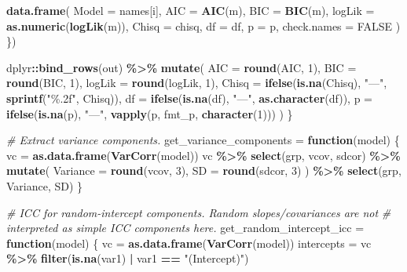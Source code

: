 \documentclass[
]{article}
\newenvironment{Shaded}{\begin{snugshade}}{\end{snugshade}}
\newcommand{\AttributeTok}[1]{\textcolor[rgb]{0.13,0.29,0.53}{#1}}
\newcommand{\CommentTok}[1]{\textcolor[rgb]{0.56,0.35,0.01}{\textit{#1}}}
\newcommand{\ConstantTok}[1]{\textcolor[rgb]{0.56,0.35,0.01}{#1}}
\newcommand{\ControlFlowTok}[1]{\textcolor[rgb]{0.13,0.29,0.53}{\textbf{#1}}}
\newcommand{\DecValTok}[1]{\textcolor[rgb]{0.00,0.00,0.81}{#1}}
\newcommand{\FunctionTok}[1]{\textcolor[rgb]{0.13,0.29,0.53}{\textbf{#1}}}
\newcommand{\NormalTok}[1]{#1}
\newcommand{\OtherTok}[1]{\textcolor[rgb]{0.56,0.35,0.01}{#1}}
\newcommand{\SpecialCharTok}[1]{\textcolor[rgb]{0.81,0.36,0.00}{\textbf{#1}}}
\newcommand{\StringTok}[1]{\textcolor[rgb]{0.31,0.60,0.02}{#1}}
\begin{document}
\begin{Shaded}
\begin{Highlighting}[]
    \FunctionTok{data.frame}\NormalTok{(}
      \AttributeTok{Model =}\NormalTok{ names[i],}
      \AttributeTok{AIC =} \FunctionTok{AIC}\NormalTok{(m),}
      \AttributeTok{BIC =} \FunctionTok{BIC}\NormalTok{(m),}
      \AttributeTok{logLik =} \FunctionTok{as.numeric}\NormalTok{(}\FunctionTok{logLik}\NormalTok{(m)),}
      \AttributeTok{Chisq =}\NormalTok{ chisq,}
      \AttributeTok{df =}\NormalTok{ df,}
      \AttributeTok{p =}\NormalTok{ p,}
      \AttributeTok{check.names =} \ConstantTok{FALSE}
\NormalTok{    )}
\NormalTok{  \})}

\NormalTok{  dplyr}\SpecialCharTok{::}\FunctionTok{bind\_rows}\NormalTok{(out) }\SpecialCharTok{\%\textgreater{}\%}
    \FunctionTok{mutate}\NormalTok{(}
      \AttributeTok{AIC =} \FunctionTok{round}\NormalTok{(AIC, }\DecValTok{1}\NormalTok{),}
      \AttributeTok{BIC =} \FunctionTok{round}\NormalTok{(BIC, }\DecValTok{1}\NormalTok{),}
      \AttributeTok{logLik =} \FunctionTok{round}\NormalTok{(logLik, }\DecValTok{1}\NormalTok{),}
      \AttributeTok{Chisq =} \FunctionTok{ifelse}\NormalTok{(}\FunctionTok{is.na}\NormalTok{(Chisq), }\StringTok{"—"}\NormalTok{, }\FunctionTok{sprintf}\NormalTok{(}\StringTok{"\%.2f"}\NormalTok{, Chisq)),}
      \AttributeTok{df =} \FunctionTok{ifelse}\NormalTok{(}\FunctionTok{is.na}\NormalTok{(df), }\StringTok{"—"}\NormalTok{, }\FunctionTok{as.character}\NormalTok{(df)),}
      \AttributeTok{p =} \FunctionTok{ifelse}\NormalTok{(}\FunctionTok{is.na}\NormalTok{(p), }\StringTok{"—"}\NormalTok{, }\FunctionTok{vapply}\NormalTok{(p, fmt\_p, }\FunctionTok{character}\NormalTok{(}\DecValTok{1}\NormalTok{)))}
\NormalTok{    )}
\NormalTok{\}}

\CommentTok{\# Extract variance components.}
\NormalTok{get\_variance\_components }\OtherTok{=} \ControlFlowTok{function}\NormalTok{(model) \{}
\NormalTok{  vc }\OtherTok{=} \FunctionTok{as.data.frame}\NormalTok{(}\FunctionTok{VarCorr}\NormalTok{(model))}
\NormalTok{  vc }\SpecialCharTok{\%\textgreater{}\%}
    \FunctionTok{select}\NormalTok{(grp, vcov, sdcor) }\SpecialCharTok{\%\textgreater{}\%}
    \FunctionTok{mutate}\NormalTok{(}
      \AttributeTok{Variance =} \FunctionTok{round}\NormalTok{(vcov, }\DecValTok{3}\NormalTok{),}
      \AttributeTok{SD =} \FunctionTok{round}\NormalTok{(sdcor, }\DecValTok{3}\NormalTok{)}
\NormalTok{    ) }\SpecialCharTok{\%\textgreater{}\%}
    \FunctionTok{select}\NormalTok{(grp, Variance, SD)}
\NormalTok{\}}

\CommentTok{\# ICC for random{-}intercept components. Random slopes/covariances are not}
\CommentTok{\# interpreted as simple ICC components here.}
\NormalTok{get\_random\_intercept\_icc }\OtherTok{=} \ControlFlowTok{function}\NormalTok{(model) \{}
\NormalTok{  vc }\OtherTok{=} \FunctionTok{as.data.frame}\NormalTok{(}\FunctionTok{VarCorr}\NormalTok{(model))}
\NormalTok{  intercepts }\OtherTok{=}\NormalTok{ vc }\SpecialCharTok{\%\textgreater{}\%}
    \FunctionTok{filter}\NormalTok{(}\FunctionTok{is.na}\NormalTok{(var1) }\SpecialCharTok{|}\NormalTok{ var1 }\SpecialCharTok{==} \StringTok{"(Intercept)"}\NormalTok{)}


\end{Highlighting}
\end{Shaded}
\end{document}
